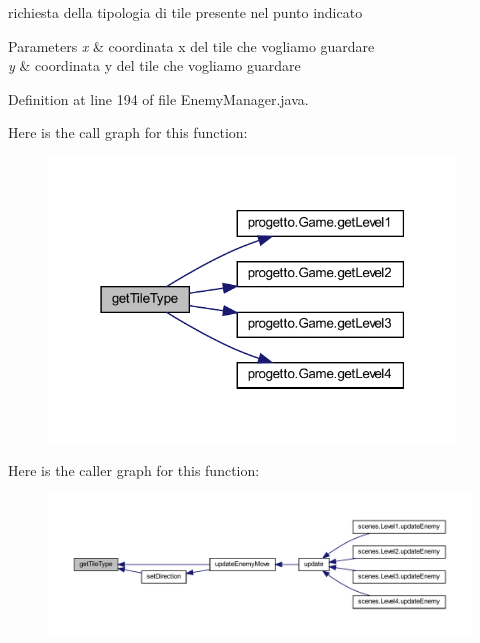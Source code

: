 richiesta della tipologia di tile presente nel punto indicato 


\begin{DoxyParams}{Parameters}
{\em x} & coordinata x del tile che vogliamo guardare \\
\hline
{\em y} & coordinata y del tile che vogliamo guardare \\
\hline
\end{DoxyParams}


Definition at line 194 of file Enemy\+Manager.\+java.

Here is the call graph for this function\+:\nopagebreak
\begin{figure}[H]
\begin{center}
\leavevmode
\includegraphics[width=307pt]{classmanagers_1_1_enemy_manager_ac689e72523c8460ac3160526d310b1b7_cgraph}
\end{center}
\end{figure}
Here is the caller graph for this function\+:\nopagebreak
\begin{figure}[H]
\begin{center}
\leavevmode
\includegraphics[width=350pt]{classmanagers_1_1_enemy_manager_ac689e72523c8460ac3160526d310b1b7_icgraph}
\end{center}
\end{figure}
\mbox{\label{classmanagers_1_1_enemy_manager_afec98871c0e021759b9d0afc8b690a18}} 
